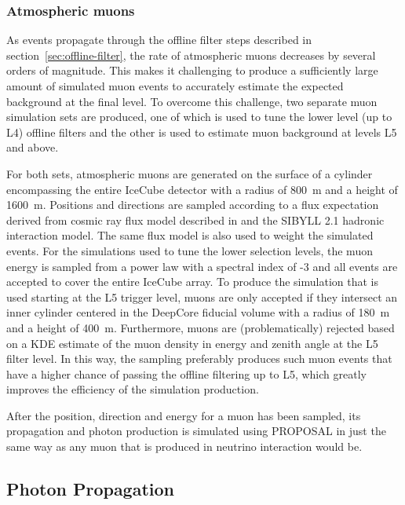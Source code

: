 \subsubsection{Atmospheric muons}
As events propagate through the offline filter steps described in section~\ref{sec:offline-filter}, the rate of atmospheric muons decreases by several orders of magnitude. This makes it challenging to produce a sufficiently large amount of simulated muon events to accurately estimate the expected background at the final level. To overcome this challenge, two separate muon simulation sets are produced, one of which is used to tune the lower level (up to L4) offline filters and the other is used to estimate muon background at levels L5 and above. 

For both sets, atmospheric muons are generated on the surface of a cylinder encompassing the entire IceCube detector with a radius of 800~m and a height of 1600~m. Positions and directions are sampled according to a flux expectation derived from cosmic ray flux model described in  and the \textsc{SIBYLL 2.1} hadronic interaction model. The same flux model is also used to weight the simulated events. For the simulations used to tune the lower selection levels, the muon energy is sampled from a power law with a spectral index of -3 and all events are accepted to cover the entire IceCube array. To produce the simulation that is used starting at the L5 trigger level, muons are only accepted if they intersect an inner cylinder centered in the DeepCore fiducial volume with a radius of 180~m and a height of 400~m. Furthermore, muons are (problematically) rejected based on a KDE estimate of the muon density in energy and zenith angle at the L5 filter level. In this way, the sampling preferably produces such muon events that have a higher chance of passing the offline filtering up to L5, which greatly improves the efficiency of the simulation production.

After the position, direction and energy for a muon has been sampled, its propagation and photon production is simulated using \textsc{PROPOSAL} in just the same way as any muon that is produced in neutrino interaction would be.


\subsection{Photon Propagation}
\label{sec:photon-propagation}

